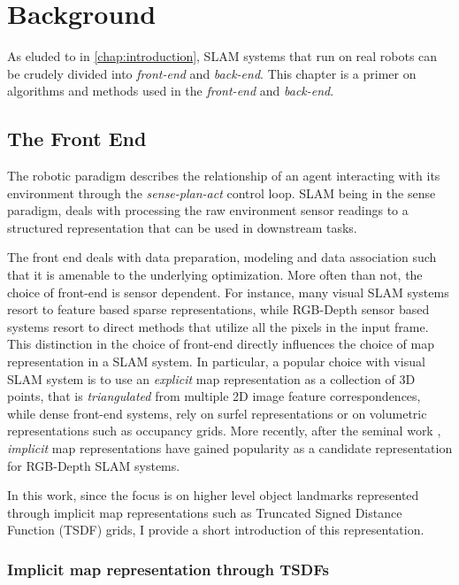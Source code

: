 \chapter{Background} \label{chap:background}

As eluded to in \ref{chap:introduction}, SLAM systems that run on real robots can be crudely divided into \emph{front-end} and \emph{back-end}. This chapter is a primer on algorithms and methods used in the \emph{front-end} and \emph{back-end}.

\section{The Front End}

The robotic paradigm describes the relationship of an agent interacting with its environment through the \emph{sense-plan-act} control loop. SLAM being in the sense paradigm, deals with processing the raw environment sensor readings to a structured representation that can be used in downstream tasks.

The front end deals with data preparation, modeling and data association such that it is amenable to the underlying optimization. More often than not, the choice of front-end is sensor dependent. For instance, many visual SLAM systems resort to feature based sparse representations, while RGB-Depth sensor based systems resort to direct methods that utilize all the pixels in the input frame. This distinction in the choice of front-end directly influences the choice of map representation in a SLAM system. In particular, a popular choice with visual SLAM system is to use an \emph{explicit} map representation as a collection of 3D points, that is \emph{triangulated} from multiple 2D image feature correspondences, while dense front-end systems, rely on surfel representations or on volumetric representations such as occupancy grids. More recently, after the seminal work \cite{newcombeKinectFusionRealtimeDense2011}, \emph{implicit} map representations have gained popularity as a candidate representation for RGB-Depth SLAM systems.

In this work, since the focus is on higher level object landmarks represented through implicit map representations such as Truncated Signed Distance Function (TSDF) grids, I provide a short introduction of this representation.

\subsection{Implicit map representation through TSDFs}

